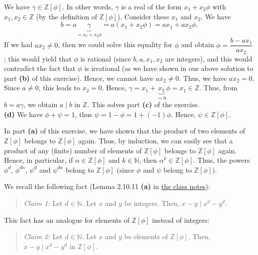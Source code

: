 \documentclass[paper=a4, fontsize=12pt]{scrartcl}%
\theoremstyle{plainsl}
\theoremstyle{definition}
\theoremstyle{remark}
\newenvironment{statement}{\begin{quote}}{\end{quote}}
\begin{document}
We have $\gamma\in\mathbb{Z}\left[  \phi\right]  $. In other words, $\gamma$
is a real of the form $x_{1}+x_{2}\phi$ with $x_{1},x_{2}\in\mathbb{Z}$ (by
the definition of $\mathbb{Z}\left[  \phi\right]  $). Consider these $x_{1}$
and $x_{2}$. We have%
\[
b=a\underbrace{\gamma}_{=x_{1}+x_{2}\phi}=a\left(  x_{1}+x_{2}\phi\right)
=ax_{1}+ax_{2}\phi.
\]
If we had $ax_{2}\neq0$, then we could solve this equality for $\phi$ and
obtain $\phi=\dfrac{b-ax_{1}}{ax_{2}}$; this would yield that $\phi$ is
rational (since $b,a,x_{1},x_{2}$ are integers), and this would contradict the
fact that $\phi$ is irrational (as we have shown in our above solution to part
\textbf{(b)} of this exercise). Hence, we cannot have $ax_{2}\neq0$. Thus, we
have $ax_{2}=0$. Since $a\neq0$, this leads to $x_{2}=0$. Hence, $\gamma
=x_{1}+\underbrace{x_{2}}_{=0}\phi=x_{1}\in\mathbb{Z}$. Thus, from $b=a\gamma
$, we obtain $a\mid b$ in $\mathbb{Z}$. This solves part \textbf{(c)} of the
exercise.\\[0.4cm]

\textbf{(d)} We have $\phi+\psi=1$, thus $\psi=1-\phi=1+\left(  -1\right)
\phi$. Hence, $\psi\in\mathbb{Z}\left[  \phi\right]  $.

In part \textbf{(a)} of this exercise, we have shown that the product of two
elements of $\mathbb{Z}\left[  \phi\right]  $ belongs to $\mathbb{Z}\left[
\phi\right]  $ again. Thus, by induction, we can easily see that a product of
any (finite) number of elements of  $\mathbb{Z}\left[  \phi\right]  $ belongs
to  $\mathbb{Z}\left[  \phi\right]  $ again. Hence, in particular, if
$\alpha\in\mathbb{Z}\left[  \phi\right]  $ and $k\in\mathbb{N}$, then
$\alpha^{k}\in\mathbb{Z}\left[  \phi\right]  $. Thus, the powers $\phi^{d}$,
$\phi^{dn}$, $\psi^{d}$ and $\psi^{dn}$ belong to $\mathbb{Z}\left[
\phi\right]  $ (since $\phi$ and $\psi$ belong to $\mathbb{Z}\left[
\phi\right]  $).

We recall the following fact (Lemma 2.10.11 \textbf{(a)} in
\href{http://www.cip.ifi.lmu.de/~grinberg/t/19s/notes.pdf}{the class notes}):

\begin{statement}
\textit{Claim 1:} Let $d\in\mathbb{N}$. Let $x$ and $y$ be integers. Then,
$x-y\mid x^{d}-y^{d}$.
\end{statement}

This fact has an analogue for elements of $\mathbb{Z}\left[  \phi\right]  $
instead of integers:

\begin{statement}
\textit{Claim 2:} Let $d\in\mathbb{N}$. Let $x$ and $y$ be elements of
$\mathbb{Z}\left[  \phi\right]  $. Then, $x-y\mid x^{d}-y^{d}$ in
$\mathbb{Z}\left[  \phi\right]  $.
\end{statement}
\end{document}

